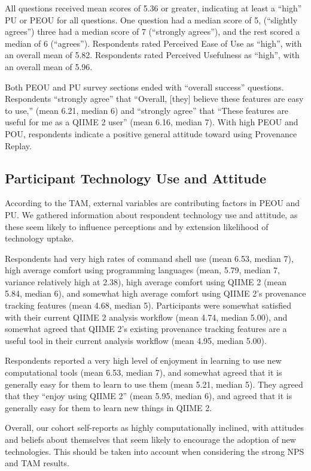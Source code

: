 All questions received mean scores of 5.36 or greater, indicating at least a
“high” PU or PEOU for all questions. One question had a median score of 5,
(“slightly agrees”) three had a median score of 7 (“strongly agrees”), and
the rest scored a median of 6 (“agrees”). Respondents rated Perceived Ease of
Use as “high”, with an overall mean of 5.82. Respondents rated Perceived
Usefulness as “high”, with an overall mean of 5.96.

Both PEOU and PU survey sections ended with “overall success” questions.
Respondents “strongly agree” that “Overall, [they] believe these features are
easy to use,” (mean 6.21, median 6) and “strongly agree” that “These features
are useful for me as a QIIME 2 user” (mean 6.16, median 7). With high PEOU and
POU, respondents indicate a positive general attitude toward using Provenance
Replay.

\subsection{Participant Technology Use and Attitude}

According to the TAM, external variables are contributing factors in PEOU and
PU. We gathered information about respondent technology use and attitude, as
these seem likely to influence perceptions and by extension likelihood of
technology uptake.

Respondents had very high rates of command shell use (mean 6.53, median 7), high
average comfort using programming languages (mean, 5.79, median 7, variance
relatively high at 2.38), high average comfort using QIIME 2 (mean 5.84, median
6), and somewhat high average comfort using QIIME 2’s provenance tracking
features (mean 4.68, median 5). Participants were somewhat satisfied with their
current QIIME 2 analysis workflow (mean 4.74, median 5.00), and somewhat agreed
that QIIME 2’s existing provenance tracking features are a useful tool in their
current analysis workflow (mean 4.95, median 5.00).

Respondents reported a very high level of enjoyment in learning to use new
computational tools (mean 6.53, median 7), and somewhat agreed that it is
generally easy for them to learn to use them (mean 5.21, median 5). They agreed
that they “enjoy using QIIME 2” (mean 5.95, median 6), and agreed that it is
generally easy for them to learn new things in QIIME 2. 

Overall, our cohort self-reports as highly computationally inclined, with
attitudes and beliefs about themselves that seem likely to encourage the
adoption of new technologies. This should be taken into account when considering
the strong NPS and TAM results.

